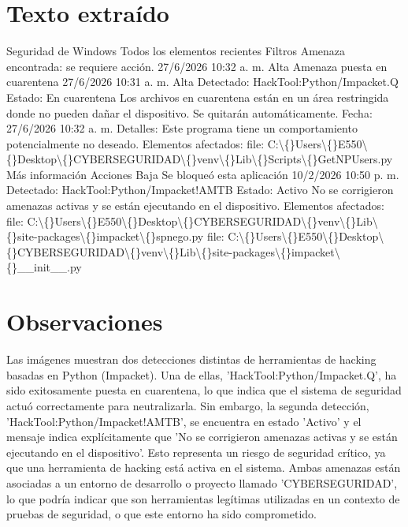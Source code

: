 \documentclass[11pt,a4paper]{article}
\begin{document}
\section*{Texto extraído}
Seguridad de Windows
Todos los elementos recientes
Filtros
Amenaza encontrada: se requiere acción.
27/6/2026 10:32 a. m.
Alta
Amenaza puesta en cuarentena
27/6/2026 10:31 a. m.
Alta
Detectado: HackTool:Python/Impacket.Q
Estado: En cuarentena
Los archivos en cuarentena están en un área restringida donde no pueden dañar el dispositivo. Se quitarán automáticamente.
Fecha: 27/6/2026 10:32 a. m.
Detalles: Este programa tiene un comportamiento potencialmente no deseado.
Elementos afectados:
file: C:\textbackslash\{\}Users\textbackslash\{\}E550\textbackslash\{\}Desktop\textbackslash\{\}CYBERSEGURIDAD\textbackslash\{\}venv\textbackslash\{\}Lib\textbackslash\{\}Scripts\textbackslash\{\}GetNPUsers.py
Más información
Acciones
Baja
Se bloqueó esta aplicación
10/2/2026 10:50 p. m.
Detectado: HackTool:Python/Impacket!AMTB
Estado: Activo
No se corrigieron amenazas activas y se están ejecutando en el dispositivo.
Elementos afectados:
file: C:\textbackslash\{\}Users\textbackslash\{\}E550\textbackslash\{\}Desktop\textbackslash\{\}CYBERSEGURIDAD\textbackslash\{\}venv\textbackslash\{\}Lib\textbackslash\{\}site-packages\textbackslash\{\}impacket\textbackslash\{\}spnego.py
file: C:\textbackslash\{\}Users\textbackslash\{\}E550\textbackslash\{\}Desktop\textbackslash\{\}CYBERSEGURIDAD\textbackslash\{\}venv\textbackslash\{\}Lib\textbackslash\{\}site-packages\textbackslash\{\}impacket\textbackslash\{\}\_\_init\_\_.py

\section*{Observaciones}
Las imágenes muestran dos detecciones distintas de herramientas de hacking basadas en Python (Impacket). Una de ellas, 'HackTool:Python/Impacket.Q', ha sido exitosamente puesta en cuarentena, lo que indica que el sistema de seguridad actuó correctamente para neutralizarla. Sin embargo, la segunda detección, 'HackTool:Python/Impacket!AMTB', se encuentra en estado 'Activo' y el mensaje indica explícitamente que 'No se corrigieron amenazas activas y se están ejecutando en el dispositivo'. Esto representa un riesgo de seguridad crítico, ya que una herramienta de hacking está activa en el sistema. Ambas amenazas están asociadas a un entorno de desarrollo o proyecto llamado 'CYBERSEGURIDAD', lo que podría indicar que son herramientas legítimas utilizadas en un contexto de pruebas de seguridad, o que este entorno ha sido comprometido.
\end{document}
